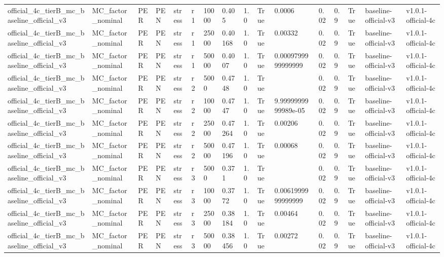 \begin{table}[!htbp]
\begin{tabular}{llllllllllllllll}
official\_4c\_tierB\_mc\_baseline\_official\_v3 & MC\_factor\_nominal & PER & PEN & stress & r1 & 10000 & 0.405 & 1.0 & True & 0.0006 & 0.02 & 0.9 & True & baseline-official-v3 & v1.0.1-official-4c \\
official\_4c\_tierB\_mc\_baseline\_official\_v3 & MC\_factor\_nominal & PER & PEN & stress & r1 & 25000 & 0.40168 & 1.0 & True & 0.00332 & 0.02 & 0.9 & True & baseline-official-v3 & v1.0.1-official-4c \\
official\_4c\_tierB\_mc\_baseline\_official\_v3 & MC\_factor\_nominal & PER & PEN & stress & r1 & 50000 & 0.4007 & 1.0 & True & 0.0009799999999999 & 0.02 & 0.9 & True & baseline-official-v3 & v1.0.1-official-4c \\
official\_4c\_tierB\_mc\_baseline\_official\_v3 & MC\_factor\_nominal & PER & PEN & stress & r2 & 5000 & 0.4748 & 1.0 & True &  & 0.02 & 0.9 & True & baseline-official-v3 & v1.0.1-official-4c \\
official\_4c\_tierB\_mc\_baseline\_official\_v3 & MC\_factor\_nominal & PER & PEN & stress & r2 & 10000 & 0.4747 & 1.0 & True & 9.9999999999989e-05 & 0.02 & 0.9 & True & baseline-official-v3 & v1.0.1-official-4c \\
official\_4c\_tierB\_mc\_baseline\_official\_v3 & MC\_factor\_nominal & PER & PEN & stress & r2 & 25000 & 0.47264 & 1.0 & True & 0.00206 & 0.02 & 0.9 & True & baseline-official-v3 & v1.0.1-official-4c \\
official\_4c\_tierB\_mc\_baseline\_official\_v3 & MC\_factor\_nominal & PER & PEN & stress & r2 & 50000 & 0.47196 & 1.0 & True & 0.00068 & 0.02 & 0.9 & True & baseline-official-v3 & v1.0.1-official-4c \\
official\_4c\_tierB\_mc\_baseline\_official\_v3 & MC\_factor\_nominal & PER & PEN & stress & r3 & 5000 & 0.371 & 1.0 & True &  & 0.02 & 0.9 & True & baseline-official-v3 & v1.0.1-official-4c \\
official\_4c\_tierB\_mc\_baseline\_official\_v3 & MC\_factor\_nominal & PER & PEN & stress & r3 & 10000 & 0.3772 & 1.0 & True & 0.0061999999999999 & 0.02 & 0.9 & True & baseline-official-v3 & v1.0.1-official-4c \\
official\_4c\_tierB\_mc\_baseline\_official\_v3 & MC\_factor\_nominal & PER & PEN & stress & r3 & 25000 & 0.38184 & 1.0 & True & 0.00464 & 0.02 & 0.9 & True & baseline-official-v3 & v1.0.1-official-4c \\
official\_4c\_tierB\_mc\_baseline\_official\_v3 & MC\_factor\_nominal & PER & PEN & stress & r3 & 50000 & 0.38456 & 1.0 & True & 0.00272 & 0.02 & 0.9 & True & baseline-official-v3 & v1.0.1-official-4c \\

\end{tabular}
\end{table}
